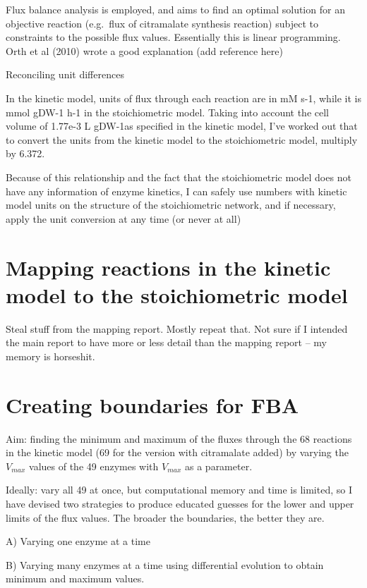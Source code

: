 \documentclass[parskip=full]{scrreprt}
\begin{document}
Flux balance analysis is employed, and aims to find an optimal solution for an objective reaction (e.g.\ flux of citramalate synthesis reaction) subject to constraints to the possible flux values. Essentially this is linear programming. Orth et al (2010) wrote a good explanation (add reference here)

Reconciling unit differences

In the kinetic model, units of flux through each reaction are in mM s-1, while it is mmol gDW-1 h-1 in the stoichiometric model. Taking into account the cell volume of 1.77e-3 L gDW-1as specified in the kinetic model, I’ve worked out that to convert the units from the kinetic model to the stoichiometric model, multiply by 6.372.

Because of this relationship and the fact that the stoichiometric model does not have any information of enzyme kinetics, I can safely use numbers with kinetic model units on the structure of the stoichiometric network, and if necessary, apply the unit conversion at any time (or never at all)

\section{Mapping reactions in the kinetic model to the stoichiometric model}
\label{sec:mapping}

Steal stuff from the mapping report. Mostly repeat that. Not sure if I intended the main report to have more or less detail than the mapping report -- my memory is horseshit.

\section{Creating boundaries for FBA}
\label{sec:bounds}

Aim: finding the minimum and maximum of the fluxes through the 68 reactions in the kinetic model (69 for the version with citramalate added) by varying the $V_{max}$ values of the 49 enzymes with $V_{max}$ as a parameter.

Ideally: vary all 49 at once, but computational memory and time is limited, so I have devised two strategies to produce educated guesses for the lower and upper limits of the flux values. The broader the boundaries, the better they are.

A) Varying one enzyme at a time

B) Varying many enzymes at a time using differential evolution to obtain minimum and maximum values.
\end{document}
